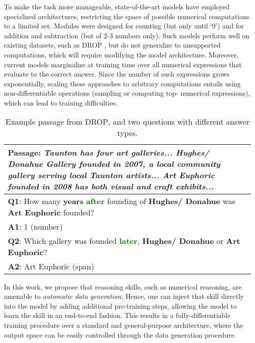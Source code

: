 \documentclass[11pt,a4paper]{article}
\newcommand\drop{\textsc{DROP}}
\begin{document}
To make the task more manageable, state-of-the-art models have employed specialized architectures, restricting the space of possible numerical computations to a limited set. Modules were designed for counting (but only until `9') and for addition and subtraction (but of 2-3 numbers only). Such models perform well on existing datasets, such as \drop{} \cite{dua2019drop}, but do not generalize to unsupported computations, which will require modifying the model architecture.
Moreover, current models marginalize at training time over all numerical expressions that evaluate to the correct answer. Since the number of such expressions grows exponentially, scaling these approaches to arbitrary computations entails using non-differentiable operations (sampling or computing top- numerical expressions), which can lead to training difficulties.

\begin{table}
\setlength{\abovecaptionskip}{-2pt}
\setlength{\belowcaptionskip}{-15pt}
\begin{center}
\footnotesize
\begin{tabular}{p{7.0cm}}
\toprule
\textbf{Passage}: \textit{Taunton has four art galleries... \textbf{\textcolor{myblue}{Hughes/ Donahue Gallery}} founded in \textbf{\textcolor{myred}{2007}}, a local community gallery serving local Taunton artists... \textbf{\textcolor{myblue}{Art Euphoric}} founded in \textbf{\textcolor{myred}{2008}} has both visual and craft exhibits...} \\ \hline
\textbf{Q1}: How many \textbf{\textcolor{myred}{years}} \textbf{\textcolor{Green}{after}} founding of \textbf{\textcolor{myblue}{Hughes/ Donahue}} was \textbf{\textcolor{myblue}{Art Euphoric}} founded? \\
\textbf{A1}: 1 (number) \\ \hline
\textbf{Q2}: Which gallery was founded \textbf{\textcolor{Green}{later}},  \textbf{\textcolor{myblue}{Hughes/ Donahue}} or \textbf{\textcolor{myblue}{Art Euphoric}}? \\
\textbf{A2}: Art Euphoric (span) \\
\toprule
\end{tabular}
\end{center}
\caption{Example passage from \drop{}, and two questions with different answer types.}
\label{table:drop_example}
\end{table}




In this work, we propose that reasoning skills, such as numerical reasoning, are amenable to \emph{automatic data generation}. Hence, one can inject that skill directly into the model by adding additional pre-training steps, allowing the model to learn the skill in an end-to-end fashion. This results in a fully-differentiable training procedure over a standard and general-purpose architecture, where the output space can be easily controlled through the data generation procedure. 
\end{document}
